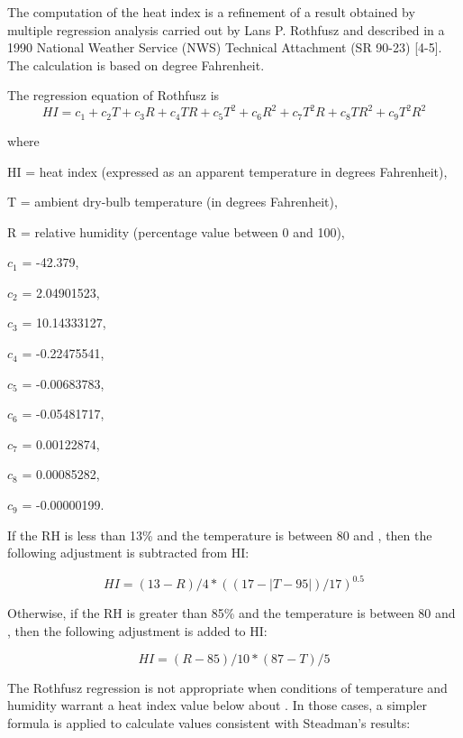 The computation of the heat index is a refinement of a result obtained by
multiple regression analysis carried out by Lans P. Rothfusz and described in a
1990 National Weather Service (NWS) Technical Attachment (SR 90-23) [4-5]. The
calculation is based on degree Fahrenheit.

The regression equation of Rothfusz is
\begin{equation}  \label{eq:rm-1}
HI = c_1 + c_2T + c_3R + c_4TR + c_5T^2 + c_6R^2 + c_7T^2R + c_8TR^2 + c_9T^2R^2
\end{equation}

where

HI = heat index (expressed as an apparent temperature in degrees Fahrenheit),

T = ambient dry-bulb temperature (in degrees Fahrenheit),

R = relative humidity (percentage value between 0 and 100),

$c_1$ = -42.379,

$c_2$ = 2.04901523,

$c_3$ = 10.14333127,

$c_4$ = -0.22475541,

$c_5$ = -0.00683783,

$c_6$ = -0.05481717,

$c_7$ = 0.00122874,

$c_8$ = 0.00085282,

$c_9$ = -0.00000199.

If the RH is less than 13\% and the temperature is between 80 and , then
the following adjustment is subtracted from HI:

\begin{equation}  \label{eq:rm-2}
HI = (13 - R) / 4 * ((17 - |T - 95|) / 17)^{0.5}
\end{equation}

Otherwise, if the RH is greater than 85\% and the temperature is between 80 and
, then the following adjustment is added to HI:

\begin{equation}  \label{eq:rm-3}
HI = (R - 85) / 10 * (87 - T) / 5
\end{equation}

The Rothfusz regression is not appropriate when conditions of temperature and
humidity warrant a heat index value below about . In those cases, a simpler
formula is applied to calculate values consistent with Steadman's results:

